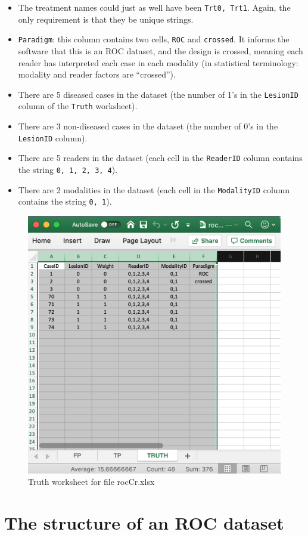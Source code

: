 \documentclass[
]{book}
\begin{document}
\begin{itemize}
\item
  The treatment names could just as well have been \texttt{Trt0,\ Trt1}. Again, the only requirement is that they be unique strings.
\item
  \texttt{Paradigm}: this column contains two cells, \texttt{ROC} and \texttt{crossed}. It informs the software that this is an ROC dataset, and the design is crossed, meaning each reader has interpreted each case in each modality (in statistical terminology: modality and reader factors are ``crossed'').
\item
  There are 5 diseased cases in the dataset (the number of 1's in the \texttt{LesionID} column of the \texttt{Truth} worksheet).
\item
  There are 3 non-diseased cases in the dataset (the number of 0's in the \texttt{LesionID} column).
\item
  There are 5 readers in the dataset (each cell in the \texttt{ReaderID} column contains the string \texttt{0,\ 1,\ 2,\ 3,\ 4}).
\item
  There are 2 modalities in the dataset (each cell in the \texttt{ModalityID} column contains the string \texttt{0,\ 1}).
\end{itemize}

\begin{figure}

{\centering \includegraphics[width=0.5\linewidth,height=0.2\textheight]{images/rocCrTruth} 

}

\caption{Truth worksheet for file rocCr.xlsx}\label{fig:showRocCrTruthSheet}
\end{figure}

\hypertarget{the-structure-of-an-roc-dataset}{%
\section{The structure of an ROC dataset}\label{the-structure-of-an-roc-dataset}}
\end{document}
